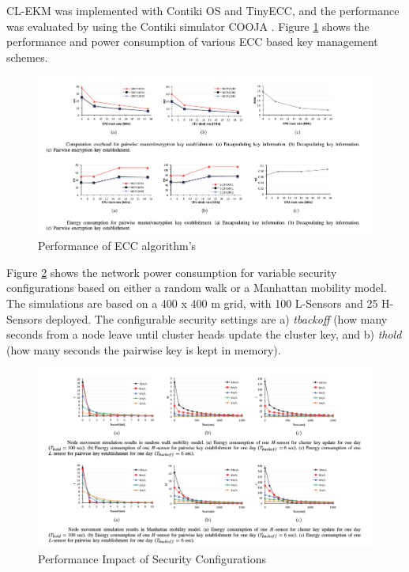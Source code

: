 \documentclass[12pt,a4paper,twoside]{report}
\begin{document}
CL-EKM was implemented with Contiki OS and TinyECC, and the performance was evaluated by using the Contiki simulator COOJA \cite{seo;etal:2015}. Figure \ref{fig:06} shows the performance and power consumption of various ECC based key management schemes. \par
\begin{figure}[ht]
	\begin{center}
  \includegraphics[width=1.0\textwidth,natwidth=1496,natheight=706]{./figures/figure-06.png}
  \end{center}
  \caption{Performance of ECC algorithm's \cite{seo;etal:2015}}
  \label{fig:06}
\end{figure}
Figure \ref{fig:07} shows the network power consumption for variable security configurations based on either a random walk or a Manhattan mobility model. The simulations are based on a 400 x 400 m grid, with 100 L-Sensors and 25 H-Sensors deployed. The configurable security settings are a) \emph{tbackoff} (how many seconds from a node leave until cluster heads update the cluster key, and b) \emph{thold} (how many seconds the pairwise key is kept in memory).\par
\begin{figure}[ht]
	\begin{center}
  \includegraphics[width=1.0\textwidth,natwidth=1502,natheight=800]{./figures/figure-07.png}
  \end{center}
  \caption{Performance Impact of Security Configurations \cite{seo;etal:2015}}
  \label{fig:07}
\end{figure}
\end{document}
